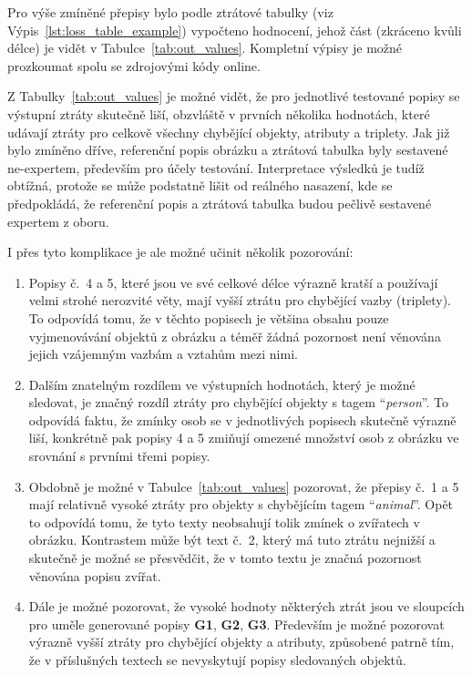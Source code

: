 Pro výše zmíněné přepisy bylo podle ztrátové tabulky (viz Výpis~\ref{lst:loss_table_example}) vypočteno hodnocení,
jehož část (zkráceno kvůli délce) je vidět v Tabulce~\ref{tab:out_values}.
Kompletní výpisy je možné prozkoumat spolu se zdrojovými kódy online.

Z Tabulky~\ref{tab:out_values} je možné vidět, že pro jednotlivé testované popisy se výstupní ztráty skutečně liší, obzvláště v prvních několika
hodnotách, které udávají ztráty pro celkově všechny chybějící objekty, atributy a triplety.
Jak již bylo zmíněno dříve, referenční popis obrázku a ztrátová tabulka byly sestavené ne-expertem, především pro účely testování.
Interpretace výsledků je tudíž obtížná, protože se může podstatně lišit od reálného nasazení, kde se předpokládá, že referenční popis a
ztrátová tabulka budou pečlivě sestavené expertem z oboru.

I přes tyto komplikace je ale možné učinit několik pozorování:
\begin{enumerate}
	\item Popisy č.~4 a 5, které jsou ve své celkové délce výrazně kratší a používají velmi strohé nerozvité věty, mají vyšší ztrátu pro chybějící vazby (triplety).
	      To odpovídá tomu, že v těchto popisech je většina obsahu pouze vyjmenovávání objektů z obrázku a téměř žádná pozornost není věnována
	      jejich vzájemným vazbám a vztahům mezi nimi.
	\item Dalším znatelným rozdílem ve výstupních hodnotách, který je možné sledovat, je značný rozdíl ztráty pro chybějící objekty s tagem \enquote{\emph{person}}.
	      To odpovídá faktu, že zmínky osob se v jednotlivých popisech skutečně výrazně liší, konkrétně pak popisy 4 a 5 zmiňují omezené množství osob z obrázku ve srovnání s prvními třemi popisy.
	\item Obdobně je možné v Tabulce~\ref{tab:out_values} pozorovat, že přepisy č.~1 a 5 mají relativně vysoké ztráty pro objekty s chybějícím tagem \enquote{\emph{animal}}.
	      Opět to odpovídá tomu, že tyto texty neobsahují tolik zmínek o zvířatech v obrázku.
	      Kontrastem může být text č.~2, který má tuto ztrátu nejnižší a skutečně je možné se přesvědčit, že v tomto textu je značná pozornost věnována popisu zvířat.
	\item Dále je možné pozorovat, že vysoké hodnoty některých ztrát jsou ve sloupcích pro uměle generované popisy \textbf{G1}, \textbf{G2}, \textbf{G3}.
	      Především je možné pozorovat výrazně vyšší ztráty pro chybějící objekty a atributy, způsobené patrně tím, že
	      v příslušných textech se nevyskytují popisy sledovaných objektů.
\end{enumerate}


